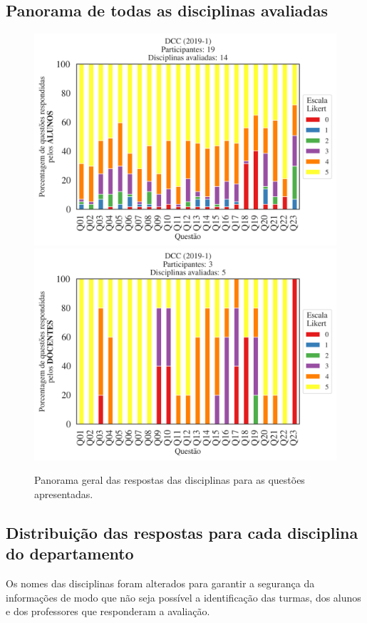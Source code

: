 \documentclass[a4paper,10pt]{article}
\begin{document}
\subsection{Panorama de todas as disciplinas avaliadas}
\begin{figure}[h]
\centering
\includegraphics[width=0.85\linewidth]{analise_geral_departamento_DCC_ALUNO_TURMA.png}
\includegraphics[width=0.85\linewidth]{analise_geral_departamento_DCC_DOCENTE_TURMA.png}
\caption{\label{fig:analise_geral_departamento}            Panorama geral das respostas das disciplinas para as questões apresentadas.}
\end{figure}
\subsection{Distribuição das respostas para cada disciplina do departamento}

Os nomes das disciplinas foram alterados para garantir a segurança da informações de modo que não seja possível a identificação das turmas, dos alunos  e dos professores que responderam a avaliação.
\end{document}
